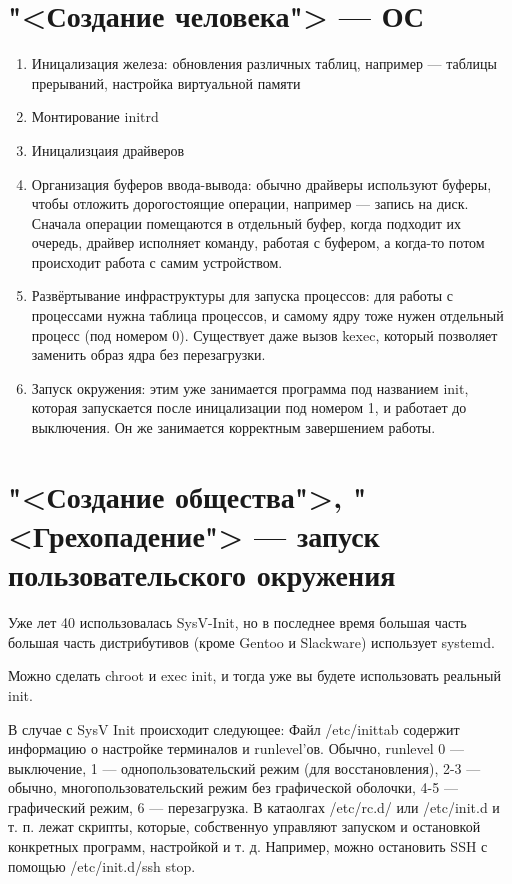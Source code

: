 \documentclass[main]{subfiles}
\begin{document}
\section{"<Создание человека"> --- ОС}
\begin{enumerate}
\item Иницализация железа: обновления различных таблиц,
например --- таблицы прерываний, настройка виртуальной памяти
\item Монтирование initrd
\item Иницализцаия драйверов
\item Организация буферов ввода-вывода: обычно драйверы используют
	буферы, чтобы отложить дорогостоящие операции, например ---
запись на диск. Сначала операции помещаются в отдельный буфер, когда
подходит их очередь, драйвер исполняет команду, работая с буфером,
а когда-то потом происходит работа с самим устройством.
\item Развёртывание инфраструктуры для запуска процессов: для работы
с процессами нужна таблица процессов, и самому ядру тоже нужен отдельный
процесс (под номером 0). Существует даже вызов kexec, который позволяет
заменить образ ядра без перезагрузки.
\item Запуск окружения: этим уже занимается программа под названием init,
	которая запускается после иницализации под номером 1, и работает
	до выключения. Он же занимается корректным завершением работы.
\end{enumerate}

\section{"<Создание общества">, "<Грехопадение"> --- запуск пользовательского окружения}
Уже лет 40 использовалась SysV-Init, но в последнее время большая часть
большая часть дистрибутивов (кроме Gentoo и Slackware) использует systemd.

Можно сделать chroot и exec init, и тогда уже вы будете использовать реальный init.

В случае с SysV Init происходит следующее:
Файл /etc/inittab содержит информацию о настройке терминалов и runlevel'ов.
Обычно, runlevel 0 --- выключение, 1 --- однопользовательский режим (для восстановления),
2-3 --- обычно, многопользовательский режим без графической оболочки,
4-5 --- графический режим, 6 --- перезагрузка.
В катаолгах /etc/rc.d/ или /etc/init.d и т. п. лежат скрипты, которые, собственнуо
управляют запуском и остановкой конкретных программ, настройкой и т. д.
Например, можно остановить SSH с помощью /etc/init.d/ssh stop.
\end{document}
